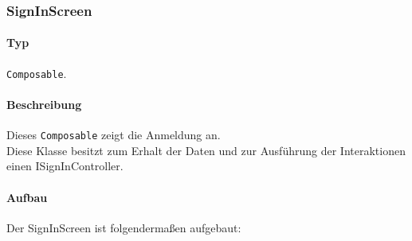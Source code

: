 \subsubsection{SignInScreen}
\paragraph*{Typ}
\texttt{Composable}.
\paragraph*{Beschreibung}
Dieses \texttt{Composable} zeigt die Anmeldung an.\\
Diese Klasse besitzt zum Erhalt der Daten und zur Ausführung der Interaktionen einen ISignInController.

\paragraph*{Aufbau}
Der SignInScreen ist folgendermaßen aufgebaut:
